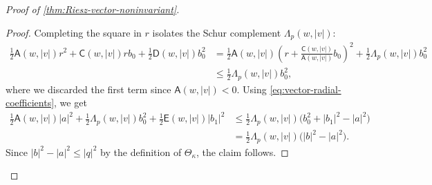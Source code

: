 \documentclass[11pt]{amsart}
\theoremstyle{definition}
\theoremstyle{remark}
\numberwithin{equation}{section}
\begin{document}
\begin{proof}[Proof of \cref{thm:Riesz-vector-noninvariant}]
\begin{proof}
Completing the square in $r$ isolates the Schur complement $\Lambda_p(w,|v|)$:
\begin{align*}
\frac12\mathsf A(w,|v|)r^2
+\mathsf C(w,|v|)rb_0
+\frac12\mathsf D(w,|v|)b_0^2
&=\frac12\mathsf A(w,|v|)
\left(r+\frac{\mathsf C(w,|v|)}{\mathsf A(w,|v|)}b_0\right)^2
+\frac12\Lambda_p(w,|v|)b_0^2\\
&\leq\frac12\Lambda_p(w,|v|)b_0^2,
\end{align*}
where we discarded the first term since $\mathsf A(w,|v|)<0$. Using \eqref{eq:vector-radial-coefficients}, we get
\begin{align*}
\frac12\mathsf A(w,|v|)|a|^2
+\frac12\Lambda_p(w,|v|)b_0^2
+\frac12\mathsf E(w,|v|)|b_1|^2
&\leq\frac12\Lambda_p(w,|v|)\bigl(b_0^2+|b_1|^2-|a|^2\bigr)\\
&=\frac12\Lambda_p(w,|v|)\bigl(|b|^2-|a|^2\bigr).
\end{align*}
Since $|b|^2-|a|^2\leq|q|^2$ by the definition of $\Theta_\kappa$, the claim follows.
\end{proof}


\end{proof}
\end{document}
